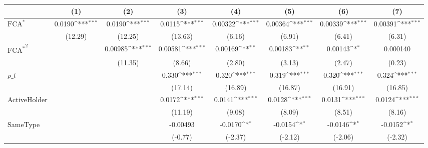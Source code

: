 {
\def\sym#1{\ifmmode^{#1}\else\(^{#1}\)\fi}
\begin{tabular}{l*{7}{c}}
\hline\hline
                    &\multicolumn{1}{c}{(1)}         &\multicolumn{1}{c}{(2)}         &\multicolumn{1}{c}{(3)}         &\multicolumn{1}{c}{(4)}         &\multicolumn{1}{c}{(5)}         &\multicolumn{1}{c}{(6)}         &\multicolumn{1}{c}{(7)}         \\
\hline
$ \text{FCA}^* $    &      0.0190\sym{***}&      0.0190\sym{***}&      0.0115\sym{***}&     0.00322\sym{***}&     0.00364\sym{***}&     0.00339\sym{***}&     0.00391\sym{***}\\
                    &     (12.29)         &     (12.25)         &     (13.63)         &      (6.16)         &      (6.91)         &      (6.41)         &      (6.31)         \\
[1em]
 $ { \text{FCA} ^ * } ^2 $&                     &     0.00985\sym{***}&     0.00581\sym{***}&     0.00169\sym{**} &     0.00183\sym{**} &     0.00143\sym{*}  &    0.000140         \\
                    &                     &     (11.35)         &      (8.66)         &      (2.80)         &      (3.13)         &      (2.47)         &      (0.23)         \\
[1em]
$ \rho\_t $          &                     &                     &       0.330\sym{***}&       0.320\sym{***}&       0.319\sym{***}&       0.320\sym{***}&       0.324\sym{***}\\
                    &                     &                     &     (17.14)         &     (16.89)         &     (16.87)         &     (16.91)         &     (16.85)         \\
[1em]
ActiveHolder        &                     &                     &      0.0172\sym{***}&      0.0141\sym{***}&      0.0128\sym{***}&      0.0131\sym{***}&      0.0124\sym{***}\\
                    &                     &                     &     (11.19)         &      (9.08)         &      (8.09)         &      (8.51)         &      (8.16)         \\
[1em]
SameType            &                     &                     &    -0.00493         &     -0.0170\sym{*}  &     -0.0154\sym{*}  &     -0.0146\sym{*}  &     -0.0152\sym{*}  \\
                    &                     &                     &     (-0.77)         &     (-2.37)         &     (-2.12)         &     (-2.06)         &     (-2.32)         \\

\end{tabular}}
